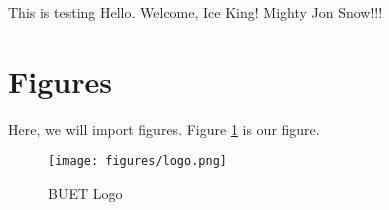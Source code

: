 \documentclass{book}
\newcommand{\testcommand}{Hello}
\newcommand{\anothertestcommand}[2]{Welcome, #2! Mighty #1!!!}
\begin{document}
This is testing \testcommand. \anothertestcommand{Jon Snow}{Ice King}

\section{Figures}

Here, we will import figures. Figure \ref{fig:bl} is our figure.

\begin{figure}[h!]
    \centering
    \texttt{[image: figures/logo.png]}
    \caption{BUET Logo}
    \label{fig:bl}
\end{figure}

\lipsum
\end{document}
